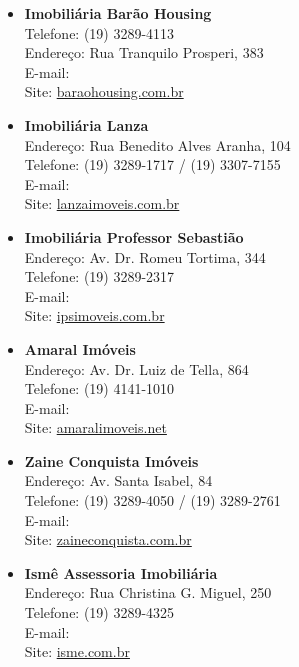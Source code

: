 \begin{itemize}
    \item   \textbf{Imobiliária Barão Housing}
        \\Telefone: (19) 3289-4113
        \\Endereço: Rua Tranquilo Prosperi, 383
        \\E-mail: 
        \\Site: \url{baraohousing.com.br}

    \item   \textbf{Imobiliária Lanza}
        \\Endereço: Rua Benedito Alves Aranha, 104
        \\Telefone: (19) 3289-1717 / (19) 3307-7155
        \\E-mail: 
        \\Site: \url{lanzaimoveis.com.br}

    \item   \textbf{Imobiliária Professor Sebastião}
        \\Endereço: Av. Dr. Romeu Tortima, 344
        \\Telefone: (19) 3289-2317
        \\E-mail: 
        \\Site: \url{ipsimoveis.com.br}

    \item   \textbf{Amaral Imóveis}
        \\Endereço: Av. Dr. Luiz de Tella, 864
        \\Telefone: (19) 4141-1010
        \\E-mail: 
        \\Site: \url{amaralimoveis.net}

    \item   \textbf{Zaine Conquista Imóveis}
        \\Endereço: Av. Santa Isabel, 84
        \\Telefone: (19) 3289-4050 / (19) 3289-2761
        \\E-mail: 
        \\Site: \url{zaineconquista.com.br}

    \item   \textbf{Ismê Assessoria Imobiliária}
        \\Endereço: Rua Christina G. Miguel, 250
        \\Telefone: (19) 3289-4325
        \\E-mail: 
        \\Site: \url{isme.com.br}


\end{itemize}
